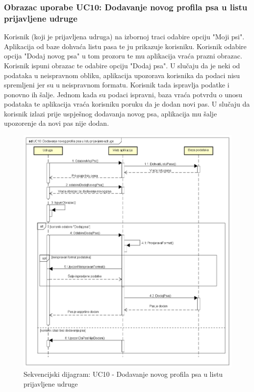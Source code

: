 			\newpage
		
		
			\subsubsection{Obrazac uporabe UC10: Dodavanje novog profila psa u listu prijavljene udruge}
			
			Korisnik (koji je prijavljena udruga) na izbornoj traci odabire opciju "Moji psi". Aplikacija od baze dohvaća listu pasa te ju prikazuje korisniku. Korisnik odabire opcija "Dodaj novog psa" u tom prozoru te mu aplikacija vraća prazni obrazac. Korisnik ispuni obrazac te odabire opciju "Dodaj psa". U slučaju da je neki od podataka u neispravnom obliku, aplikacija upozorava korisnika da podaci nisu spremljeni jer su u neispravnom formatu. Korisnik tada ispravlja podatke i ponovno ih šalje. Jednom kada su podaci ispravni, baza vraća potvrdu o unosu podataka te aplikacija vraća korisniku poruku da je dodan novi pas. U slučaju da korisnik izlazi prije uspješnog dodavanja novog psa, aplikacija mu šalje upozorenje da novi pas nije dodan.
			
			\begin{figure}[H]
			\includegraphics[scale=0.6]{dijagrami/UC10.png} %
			\caption{Sekvencijski dijagram: UC10 - Dodavanje novog profila psa u listu prijavljene udruge}
			\label{fig:UC10} %
			\end{figure}
		
